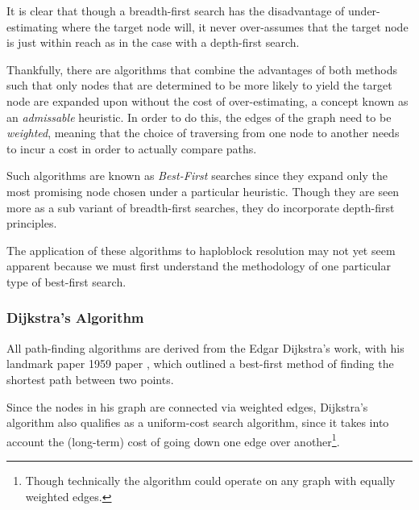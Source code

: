 It is clear that though a breadth-first search has the disadvantage of under-estimating where the target node will, it never over-assumes that the target node is just within reach as in the case with a depth-first search.

Thankfully, there are algorithms that combine the advantages of both methods such that only nodes that are determined to be more likely to yield the target node are expanded upon without the cost of over-estimating, a concept known as an \textit{admissable} heuristic. In order to do this, the edges of the graph need to be \textit{weighted}, meaning that the choice of traversing from one node to another needs to incur a cost in order to actually compare paths. 

Such algorithms are known as \textit{Best-First} searches since they expand only the most promising node chosen under a particular heuristic. Though they are seen more as a sub variant of breadth-first searches, they do incorporate depth-first principles.

The application of these algorithms to haploblock resolution may not yet seem apparent because we must first understand the methodology of one particular type of best-first search. 


\subsubsection{Dijkstra's Algorithm}

All path-finding algorithms are derived from the Edgar Dijkstra's work, with his landmark paper 1959 paper \citep{Dijkstra1959}, which outlined a best-first method of finding the shortest path between two points. 

Since the nodes in his graph are connected via weighted edges, Dijkstra's algorithm also qualifies as a uniform-cost search algorithm, since it takes into account the (long-term) cost of going down one edge over another\footnote{Though technically the algorithm could operate on any graph with equally weighted edges.}.  

